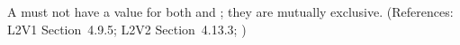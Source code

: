 A \SpeciesReference must not have a value for both 
and ; they are mutually exclusive.  (References:
L2V1 Section~4.9.5; L2V2 Section~4.13.3; )
